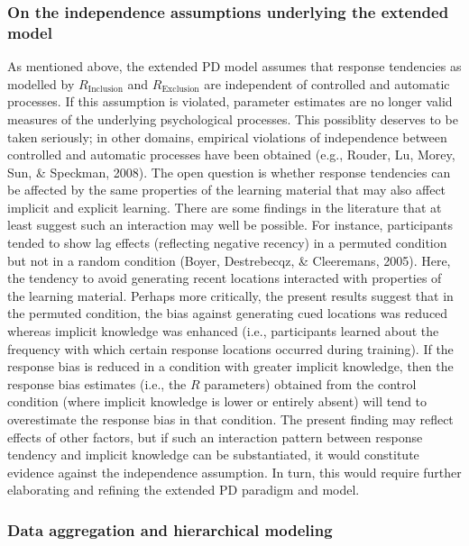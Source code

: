 \documentclass[
  english,
  man]{apa6}
\begin{document}
\hypertarget{on-the-independence-assumptions-underlying-the-extended-model}{%
\subsubsection{On the independence assumptions underlying the extended model}\label{on-the-independence-assumptions-underlying-the-extended-model}}

As mentioned above, the extended PD model assumes that response tendencies as modelled by \(R_{\mathrm{Inclusion}}\) and \(R_{\mathrm{Exclusion}}\) are independent of controlled and automatic processes.
If this assumption is violated, parameter estimates are no longer valid measures of the underlying psychological processes.
This possiblity deserves to be taken seriously; in other domains, empirical violations of independence between controlled and automatic processes have been obtained (e.g., Rouder, Lu, Morey, Sun, \& Speckman, 2008).
The open question is whether response tendencies can be affected by the same properties of the learning material that may also affect implicit and explicit learning.
There are some findings in the literature that at least suggest such an interaction may well be possible.
For instance, participants tended to show lag effects (reflecting negative recency) in a permuted condition but not in a random condition (Boyer, Destrebecqz, \& Cleeremans, 2005).
Here, the tendency to avoid generating recent locations interacted with properties of the learning material.
Perhaps more critically, the present results suggest that in the permuted condition, the bias against generating cued locations was reduced whereas implicit knowledge was enhanced (i.e., participants learned about the frequency with which certain response locations occurred during training).
If the response bias is reduced in a condition with greater implicit knowledge, then the response bias estimates (i.e., the \(R\) parameters) obtained from the control condition (where implicit knowledge is lower or entirely absent) will tend to overestimate the response bias in that condition.
The present finding may reflect effects of other factors, but if such an interaction pattern between response tendency and implicit knowledge can be substantiated, it would constitute evidence against the independence assumption.
In turn, this would require further elaborating and refining the extended PD paradigm and model.

\hypertarget{data-aggregation-and-hierarchical-modeling}{%
\subsubsection{Data aggregation and hierarchical modeling}\label{data-aggregation-and-hierarchical-modeling}}
\end{document}
